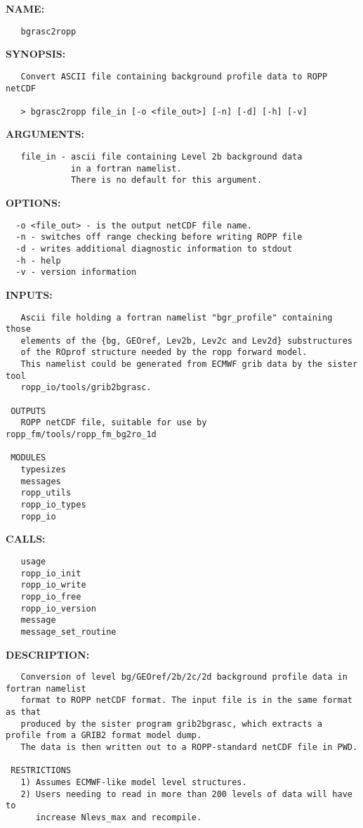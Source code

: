 \label{ch:robo79}
\label{ch:Programs_bgrasc2ropp}
\textbf{NAME:}\hspace{0.08in}\begin{Verbatim}
   bgrasc2ropp
\end{Verbatim}
\textbf{SYNOPSIS:}\hspace{0.08in}\begin{Verbatim}
   Convert ASCII file containing background profile data to ROPP netCDF

   > bgrasc2ropp file_in [-o <file_out>] [-n] [-d] [-h] [-v]
\end{Verbatim}
\textbf{ARGUMENTS:}\hspace{0.08in}\begin{Verbatim}
   file_in - ascii file containing Level 2b background data
             in a fortran namelist.
             There is no default for this argument.
\end{Verbatim}
\textbf{OPTIONS:}\hspace{0.08in}\begin{Verbatim}
  -o <file_out> - is the output netCDF file name.
  -n - switches off range checking before writing ROPP file
  -d - writes additional diagnostic information to stdout
  -h - help
  -v - version information
\end{Verbatim}
\textbf{INPUTS:}\hspace{0.08in}\begin{Verbatim}
   Ascii file holding a fortran namelist "bgr_profile" containing those
   elements of the {bg, GEOref, Lev2b, Lev2c and Lev2d} substructures 
   of the ROprof structure needed by the ropp forward model. 
   This namelist could be generated from ECMWF grib data by the sister tool
   ropp_io/tools/grib2bgrasc.

 OUTPUTS
   ROPP netCDF file, suitable for use by ropp_fm/tools/ropp_fm_bg2ro_1d

 MODULES
   typesizes
   messages
   ropp_utils
   ropp_io_types
   ropp_io
\end{Verbatim}
\textbf{CALLS:}\hspace{0.08in}\begin{Verbatim}
   usage
   ropp_io_init
   ropp_io_write
   ropp_io_free
   ropp_io_version
   message
   message_set_routine
\end{Verbatim}
\textbf{DESCRIPTION:}\hspace{0.08in}\begin{Verbatim}
   Conversion of level bg/GEOref/2b/2c/2d background profile data in fortran namelist 
   format to ROPP netCDF format. The input file is in the same format as that 
   produced by the sister program grib2bgrasc, which extracts a profile from a GRIB2 format model dump. 
   The data is then written out to a ROPP-standard netCDF file in PWD.

 RESTRICTIONS
   1) Assumes ECMWF-like model level structures.
   2) Users needing to read in more than 200 levels of data will have to
      increase Nlevs_max and recompile.
\end{Verbatim}
